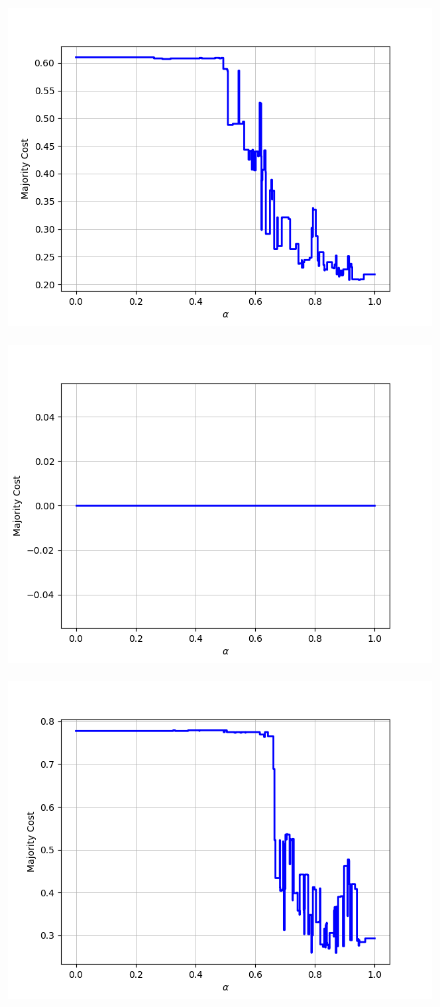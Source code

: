 \begin{figure}[h]
\begin{minipage}{.24\textwidth}
  {\includegraphics[width=\linewidth]{plots/nell-sc/attraction}}
\end{minipage}
\begin{minipage}{.24\textwidth}
  \centering
  {\includegraphics[width=\linewidth]{plots/nell-sc/beverage}}
\end{minipage}
\begin{minipage}{.24\textwidth}
  \centering
  {\includegraphics[width=\linewidth]{plots/nell-sc/bodypart}}

\end{minipage}
\end{figure}
